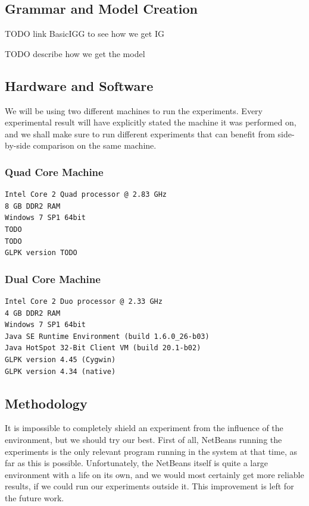 \subsection{Grammar and Model Creation}

TODO link BasicIGG to see how we get IG

TODO describe how we get the model

\subsection{Hardware and Software}

We will be using two different machines to run the experiments. Every experimental result will have explicitly stated the machine it was performed on, and we shall make sure to run different experiments that can benefit from side-by-side comparison on the same machine.

\subsubsection{Quad Core Machine}

\begin{verbatim}
Intel Core 2 Quad processor @ 2.83 GHz
8 GB DDR2 RAM
Windows 7 SP1 64bit
TODO
TODO
GLPK version TODO
\end{verbatim}

\subsubsection{Dual Core Machine}

\begin{verbatim}
Intel Core 2 Duo processor @ 2.33 GHz
4 GB DDR2 RAM
Windows 7 SP1 64bit
Java SE Runtime Environment (build 1.6.0_26-b03)
Java HotSpot 32-Bit Client VM (build 20.1-b02)
GLPK version 4.45 (Cygwin)
GLPK version 4.34 (native)
\end{verbatim}

\subsection{Methodology}

It is impossible to completely shield an experiment from the influence of the environment, but we should try our best. First of all, NetBeans running the experiments is the only relevant program running in the system at that time, as far as this is possible. Unfortunately, the NetBeans itself is quite a large environment with a life on its own, and we would most certainly get more reliable results, if we could run our experiments outside it. This improvement is left for the future work.

